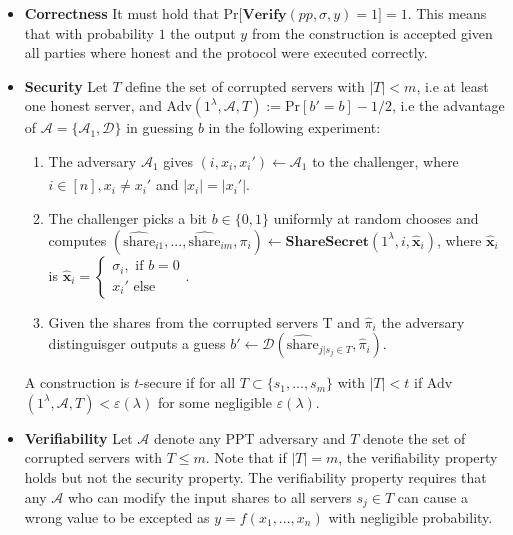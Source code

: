 \begin{itemize}
    \item \textbf{Correctness} It must hold that Pr$\Big[\textbf{Verify}(pp,\sigma,y)=1\Big]=1$. This means that with probability $1$ the output $y$ from the construction is accepted given all parties where honest and the protocol were executed correctly.
    \item \textbf{Security} Let $T$ define the set of corrupted servers with $|T|<m$, i.e at least one honest server, and Adv$(1^\lambda,\mathcal{A},T):= \text{Pr}[b' = b]-1/2$, i.e the advantage of $\mathcal{A}=\{\mathcal{A}_1,\mathcal{D}\}$ in guessing $b$ in the following experiment:
    \begin{enumerate}
        \item The adversary $\mathcal{A}_1$ gives $(i,x_i,x_i')\xleftarrow[]{}\mathcal{A}_1$ to the challenger, where $i\in[n], x_i\neq x_i'$ and $|x_i|=|x_i'|$.
        \item The challenger picks a bit $b\in\{0,1\}$ uniformly at random chooses and computes $(\hat{\text{share}}_{i1},...,\hat{\text{share}}_{im},\pi_i)\xleftarrow[]{}\textbf{ShareSecret}(1^\lambda,i,\hat{\mathbf{x}}_i)$, where $\hat{\textbf{x}}_i$ is $\hat{\textbf{x}}_i = \begin{cases}\sigma_i, \text{ if } b=0 \\ x_i' \text{ else} \end{cases}$. 
        \item Given the shares from the corrupted servers T and $\hat{\pi}_i$ the adversary distinguisger outputs a guess $b'\xleftarrow[]{}\mathcal{D}(\hat{\text{share}}_{j|s_j\in T},\hat{\pi}_i)$.
    \end{enumerate}
    A construction is $t$-secure if for all $T\subset \{s_1,...,s_m\}$ with $|T|<t$ if Adv$(1^\lambda,\mathcal{A},T)<\varepsilon(\lambda)$ for some negligible $\varepsilon(\lambda)$.
 \item \textbf{Verifiability} Let $\mathcal{A}$ denote any PPT  adversary and $T$ denote the set of corrupted servers with $T\leq m$. Note that if $|T|=m$, the verifiability property holds but not the security property. The verifiability property requires that any $\mathcal{A}$ who can modify the input shares to all servers $s_j\in T$ can cause a wrong value to be excepted as $y=f(x_1,...,x_n)$ with negligible probability.   
\end{itemize}


